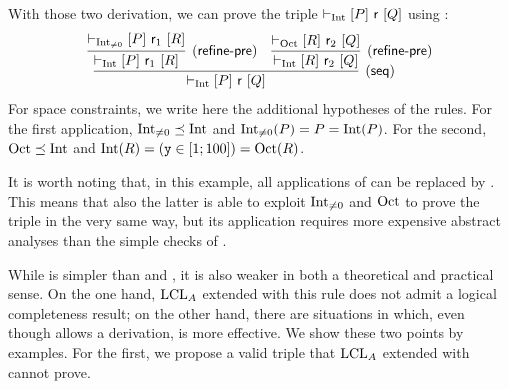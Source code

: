 \begin{example}
	With those two derivation, we can prove the triple $\vdash_{\text{Int}}\nobreak[P]~\mathsf{r}~[Q]$ using \lclrule{refine\mbox{-}pre}:
	\[
	\infer[(\mathsf{seq})]
	{\lcl{\Int}{P}{\regr}{Q}}
	{
		\infer[(\mathsf{refine\mbox{-}pre})]
		{\lcl{\Int}{P}{\regr_1}{R}}
		{\lcl{\Int_{\neq 0}}{P}{\regr_1}{R}}
		&
		\infer[(\mathsf{refine\mbox{-}pre})]
		{\lcl{\Int}{R}{\regr_2}{Q}}
		{\lcl{\Oct}{R}{\regr_2}{Q}}
	}
	\]
	For space constraints, we write here the additional hypotheses of the rules. For the first application, $\text{Int}_{\neq 0} \preceq \text{Int}$ and $\text{Int}_{\neq 0}(P) = P = \text{Int}(P)$. For the second, $\text{Oct} \preceq \text{Int}$ and $\text{Int}(R) = (\texttt{y} \in [1; 100]) = \text{Oct}(R)$.

	It is worth noting that, in this example, all applications of  can be replaced by . This means that also the latter is able to exploit $\text{Int}_{\neq 0}$ and $\text{Oct}$ to prove the triple in the very same way, but its application requires more expensive abstract analyses than the simple checks of .
\end{example}

While  is simpler than  and , it is also weaker in both a theoretical and practical sense. On the one hand, $\text{LCL}_A$ extended with this rule does not admit a logical completeness result; on the other hand, there are situations in which, even though  allows a derivation,  is more effective. We show these two points by examples.
For the first, we propose a valid triple that $\text{LCL}_A$ extended with  cannot prove.


